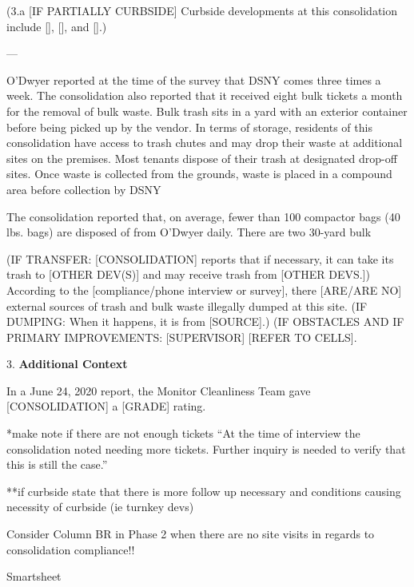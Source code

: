 (3.a [IF PARTIALLY CURBSIDE] Curbside developments at this consolidation include [], [], and [].)

---

O'Dwyer reported at the time of the survey that DSNY comes three times a week. The consolidation also reported that it received eight bulk tickets a month for the removal of bulk waste. Bulk trash sits in a yard with an exterior container before being picked up by the vendor. In terms of storage, residents of this consolidation have access to trash chutes and may drop their waste at  additional sites on the premises. Most tenants dispose of their trash at designated drop-off sites. Once waste is collected from the grounds, waste is placed in a compound area before collection by DSNY

The consolidation reported that, on average, fewer than 100 compactor bags (40 lbs. bags) are disposed of from O'Dwyer daily. There are two 30-yard bulk  

(IF TRANSFER: [CONSOLIDATION] reports that if necessary, it can take its trash to [OTHER DEV(S)] and may receive trash from [OTHER DEVS.]) According to the [compliance/phone interview or survey], there [ARE/ARE NO] external sources of trash and bulk waste illegally dumped at this site. (IF DUMPING: When it happens, it is from [SOURCE].) (IF OBSTACLES AND IF PRIMARY IMPROVEMENTS: [SUPERVISOR] [REFER TO CELLS]. 

3. \textbf{Additional Context} 

In a June 24, 2020 report, the Monitor Cleanliness Team gave [CONSOLIDATION] a [GRADE] rating. 

*make note if there are not enough tickets ``At the time of interview the consolidation noted needing more tickets. Further inquiry is needed to verify that this is still the case.''

**if curbside state that there is more follow up necessary and conditions causing necessity of curbside (ie turnkey devs)

Consider Column BR in Phase 2 when there are no site visits in regards to consolidation compliance!!

Smartsheet